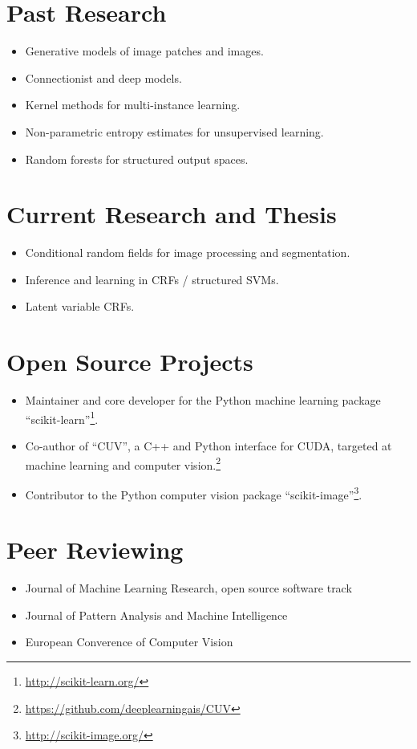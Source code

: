 \documentclass[a4paper,11pt]{article}
\begin{document}
\section{Past Research}
\begin{itemize}
    \item Generative models of image patches and images.
    \item Connectionist and deep models.
    \item Kernel methods for multi-instance learning.
    \item Non-parametric entropy estimates for unsupervised learning.
    \item Random forests for structured output spaces.
\end{itemize}

\section{Current Research and Thesis}
\begin{itemize}
    \item Conditional random fields for image processing and segmentation.
    \item Inference and learning in CRFs / structured SVMs.
    \item Latent variable CRFs.
\end{itemize}

\section{Open Source Projects}
\begin{itemize}
    \item Maintainer and core developer for the Python machine learning package ``scikit-learn''\footnote{\url{http://scikit-learn.org/}}.
    \item Co-author of ``CUV'', a C++ and Python interface for CUDA,
        targeted at machine learning and computer vision.\footnote{\url{https://github.com/deeplearningais/CUV}}
    \item Contributor to the Python computer vision package ``scikit-image''\footnote{\url{http://scikit-image.org/}}.
\end{itemize}
\pagebreak

\section{Peer Reviewing}
\begin{itemize}
    \item Journal of Machine Learning Research, open source software track
    \item Journal of Pattern Analysis and Machine Intelligence
    \item European Converence of Computer Vision
\end{itemize}
\end{document}
